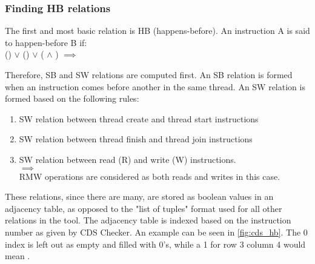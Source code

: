 \subsubsection{Finding HB relations}
The first and most basic relation is HB (happens-before). An instruction A is said to happen-before B if:\\
() $\lor$ () $\lor$ ( $\land$ ) $\implies$ 

\par
Therefore, SB and SW relations are computed first. An SB relation is formed when an instruction comes before another in the same thread. An SW relation is formed based on the following rules:
\begin{enumerate}
\item SW relation between thread create and thread start instructions\\

\item SW relation between thread finish and thread join instructions\\

\item SW relation between read (R) and write (W) instructions.\\
 $\implies$ \\
RMW operations are considered as both reads and writes in this case.
\end{enumerate}

\par
These relations, since there are many, are stored as boolean values in an adjacency table, as opposed to the "list of tuples" format used for all other relations in the tool. The adjacency table is indexed based on the instruction number as given by CDS Checker. An example can be seen in \ref{fig:cds_hb}. The 0 index is left out as empty and filled with 0's, while a 1 for row 3 column 4 would mean .

%	

